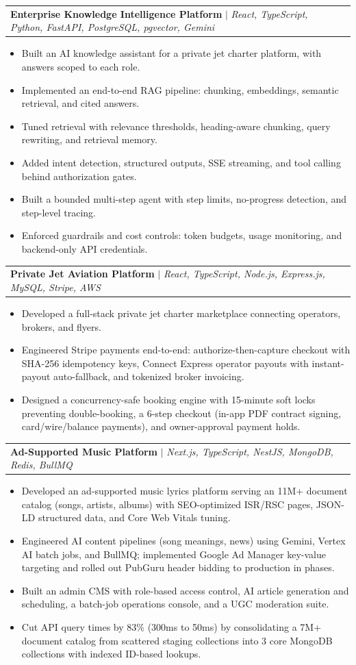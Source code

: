 \documentclass[letterpaper,11pt]{article}
\makeatletter
\newcommand{\resumeItem}[1]{\item\small{{#1 \vspace{-2pt}}}}
\newcommand{\resumeProjectHeading}[2]{
  \item
  \begin{tabular*}{1.001\textwidth}{l@{\extracolsep{\fill}}r}
    \small #1 & \textbf{\small #2} \\
  \end{tabular*}\vspace{-7pt}
}
\newcommand{\resumeItemListStart}{\begin{itemize}}
\newcommand{\resumeItemListEnd}{\end{itemize}\vspace{-5pt}}
\makeatother
\begin{document}
  \resumeProjectHeading
    {\textbf{Enterprise Knowledge Intelligence Platform} $|$ \emph{React, TypeScript, Python, FastAPI, PostgreSQL, pgvector, Gemini}}{}
  \resumeItemListStart
    \resumeItem{Built an AI knowledge assistant for a private jet charter platform, with answers scoped to each role.}
    \resumeItem{Implemented an end-to-end RAG pipeline: chunking, embeddings, semantic retrieval, and cited answers.}
    \resumeItem{Tuned retrieval with relevance thresholds, heading-aware chunking, query rewriting, and retrieval memory.}
    \resumeItem{Added intent detection, structured outputs, SSE streaming, and tool calling behind authorization gates.}
    \resumeItem{Built a bounded multi-step agent with step limits, no-progress detection, and step-level tracing.}
    \resumeItem{Enforced guardrails and cost controls: token budgets, usage monitoring, and backend-only API credentials.}
  \resumeItemListEnd

  \vspace{-10pt}

  \resumeProjectHeading
    {\textbf{Private Jet Aviation Platform} $|$ \emph{React, TypeScript, Node.js, Express.js, MySQL, Stripe, AWS}}{}
  \resumeItemListStart
    \resumeItem{Developed a full-stack private jet charter marketplace connecting operators, brokers, and flyers.}
    \resumeItem{Engineered Stripe payments end-to-end: authorize-then-capture checkout with SHA-256 idempotency keys, Connect Express operator payouts with instant-payout auto-fallback, and tokenized broker invoicing.}
    \resumeItem{Designed a concurrency-safe booking engine with 15-minute soft locks preventing double-booking, a 6-step checkout (in-app PDF contract signing, card/wire/balance payments), and owner-approval payment holds.}
  \resumeItemListEnd

  \vspace{-10pt}

  \resumeProjectHeading
    {\textbf{Ad-Supported Music Platform} $|$ \emph{Next.js, TypeScript, NestJS, MongoDB, Redis, BullMQ}}{}
  \resumeItemListStart
    \resumeItem{Developed an ad-supported music lyrics platform serving an 11M+ document catalog (songs, artists, albums) with SEO-optimized ISR/RSC pages, JSON-LD structured data, and Core Web Vitals tuning.}
    \resumeItem{Engineered AI content pipelines (song meanings, news) using Gemini, Vertex AI batch jobs, and BullMQ; implemented Google Ad Manager key-value targeting and rolled out PubGuru header bidding to production in phases.}
    \resumeItem{Built an admin CMS with role-based access control, AI article generation and scheduling, a batch-job operations console, and a UGC moderation suite.}
    \resumeItem{Cut API query times by 83\% (300ms to 50ms) by consolidating a 7M+ document catalog from scattered staging collections into 3 core MongoDB collections with indexed ID-based lookups.}
  \resumeItemListEnd
\end{document}
